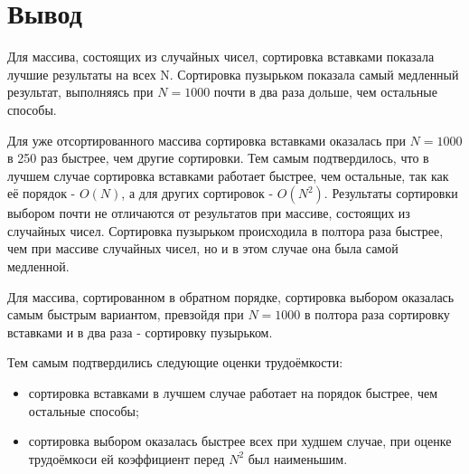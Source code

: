 \section{Вывод} 
Для массива, состоящих из случайных чисел, сортировка вставками показала лучшие результаты на всех N.
Сортировка пузырьком показала самый медленный результат, выполняясь при $N = 1000$ почти в два раза дольше,
чем остальные способы.

Для уже отсортированного массива сортировка вставками оказалась при $N = 1000$ в 250 раз быстрее, чем
другие сортировки. Тем самым подтвердилось, что в лучшем случае сортировка вставками
работает быстрее, чем остальные, так как её порядок - $O(N)$, а для других сортировок - $O(N^2)$.
Результаты сортировки выбором почти не отличаются от результатов при массиве, состоящих из случайных чисел.
Сортировка пузырьком происходила в полтора раза быстрее, чем при массиве случайных чисел, но и в этом
случае она была самой медленной.

Для массива, сортированном в обратном порядке, сортировка выбором оказалась самым быстрым вариантом,
превзойдя при $N = 1000$ в полтора раза сортировку вставками и в два раза - сортировку пузырьком.

Тем самым подтвердились следующие оценки трудоёмкости:
\begin{itemize}
	\item сортировка вставками в лучшем случае работает на порядок быстрее, чем остальные способы;
	\item сортировка выбором оказалась быстрее всех при худшем случае, при оценке трудоёмкоси ей коэффициент перед $N^2$ был наименьшим.
\end{itemize} 